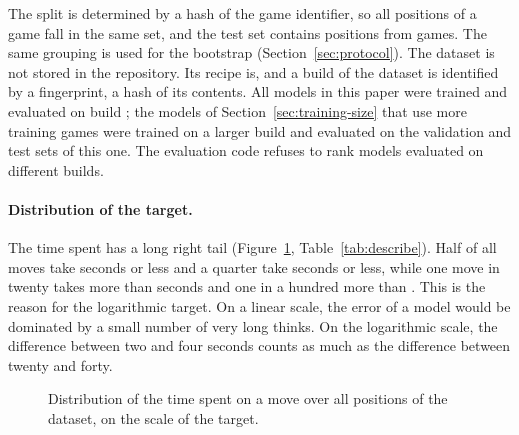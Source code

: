 \documentclass[11pt]{article}
\begin{document}
The split is determined by a hash of the game identifier, so all positions
of a game fall in the same set, and the test set contains positions from
 games. The same grouping is used for the bootstrap
(Section~\ref{sec:protocol}). The dataset is not stored in the repository.
Its recipe is, and a build of the dataset is identified by a fingerprint, a
hash of its contents. All models in this paper were trained and evaluated on
build \ifmore; the models of
Section~\ref{sec:training-size} that use more training games were trained on
a larger build and evaluated on the validation and test sets of this
one\fi. The evaluation code refuses to rank models evaluated on different
builds.

\begin{table}[htbp]\centering\small
{}
\caption{Dataset statistics by split. The mean target is converted to
seconds: it is the typical time defined in Section~\ref{sec:protocol}.}
\label{tab:data}
\end{table}

\iflook
\paragraph{Distribution of the target.}
The time spent has a long right tail (Figure~\ref{fig:label},
Table~\ref{tab:describe}). Half of all moves take 
seconds or less and a quarter take  seconds or less,
while one move in twenty takes more than  seconds and
one in a hundred more than . This is the reason for the
logarithmic target. On a linear scale, the error of a model would be
dominated by a small number of very long thinks. On the logarithmic scale,
the difference between two and four seconds counts as much as the difference
between twenty and forty.

\begin{figure}[htbp]\centering
{}
\caption{Distribution of the time spent on a move over all positions of the
dataset, on the scale of the target.}
\label{fig:label}
\end{figure}

\begin{table}[htbp]\centering\small
{}
\caption{Summary statistics of selected variables over the whole dataset:
the mean, five quantiles, the minimum and the maximum. Clock times and the
time spent are in seconds. The time spent is the target and is not an
input.}
\label{tab:describe}
\end{table}
\fi
\end{document}
